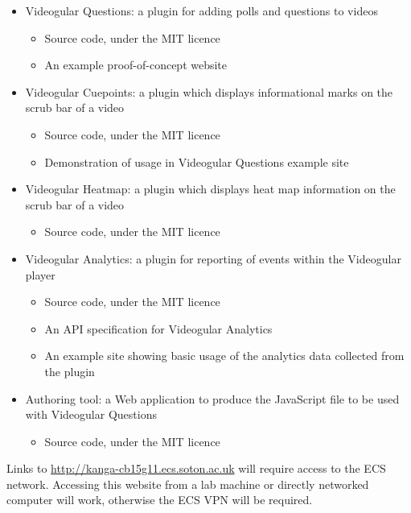 \documentclass[12pt,a4paper]{article}
\begin{document}
\begin{itemize}
\item Videogular Questions: a plugin for adding polls and questions to videos
	\begin{itemize}
	\item Source code, under the MIT licence
	\item An example proof-of-concept website
	\end{itemize}
	
\item Videogular Cuepoints: a plugin which displays informational marks on the scrub bar of a video
	\begin{itemize}
	\item Source code, under the MIT licence
	\item Demonstration of usage in Videogular Questions example site
	\end{itemize}
	
\item Videogular Heatmap: a plugin which displays heat map information on the scrub bar of a video
	\begin{itemize}
	\item Source code, under the MIT licence
	\end{itemize}
	
\item Videogular Analytics: a plugin for reporting of events within the Videogular player
	\begin{itemize}
	\item Source code, under the MIT licence
	\item An API specification for Videogular Analytics
	\item An example site showing basic usage of the analytics data collected from the plugin
	\end{itemize}
	
\item Authoring tool: a Web application to produce the JavaScript file to be used with Videogular Questions
	\begin{itemize}
	\item Source code, under the MIT licence
	\end{itemize}
\end{itemize}

Links to \url{http://kanga-cb15g11.ecs.soton.ac.uk} will require access to the ECS network. Accessing this website from a lab machine or directly networked computer will work, otherwise the ECS VPN will be required.
\end{document}
